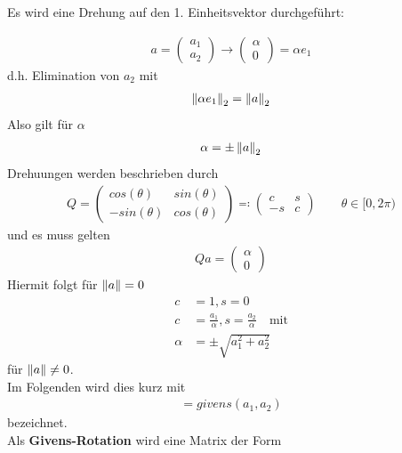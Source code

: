 Es wird eine Drehung auf den 1. Einheitsvektor durchgeführt:
\label{im4.4.a}

\begin{gather*}
a=\begin{pmatrix}a_1 \\ a_2\end{pmatrix} \rightarrow \begin{pmatrix}\alpha \\ 0 \end{pmatrix}
= \alpha e_1
\end{gather*}
d.h. Elimination von $a_2$ mit
\begin{gather*}
\left\| \alpha e_1 \right\|_2 = \left\| a \right\|_2
\end{gather*}
Also gilt für $\alpha$
\begin{gather*}
\alpha=\pm \left\| a \right\|_2
\end{gather*}
Drehuungen werden beschrieben durch
\begin{gather*}
Q = \begin{pmatrix}
cos(\theta) & sin(\theta)\\
-sin(\theta) & cos(\theta)
\end{pmatrix}
\eqqcolon \begin{pmatrix}
c & s\\
-s & c
\end{pmatrix}\qquad \theta \in[0,2\pi)
\end{gather*}
und es muss gelten
\begin{gather*}
Qa = \begin{pmatrix}\alpha \\ 0 \end{pmatrix}
\end{gather*}
Hiermit folgt für $\left\| a \right\|= 0$
\begin{align}
\nonumber
c&=1, s=0\\ \nonumber
c&=\frac{a_1}{\alpha},  s= \frac{a_2}{\alpha}\quad \text{mit}\\
\alpha & = \pm \sqrt{a_1^2+a_2^2}
\label{IV.4.4}
\end{align}
für $\left\| a \right\|\neq 0$.\\
Im Folgenden wird dies kurz mit
\begin{gather*}
[c,s] = givens(a_1, a_2)
\end{gather*}
bezeichnet. \\
Als \textbf{Givens-Rotation} wird eine Matrix der Form
